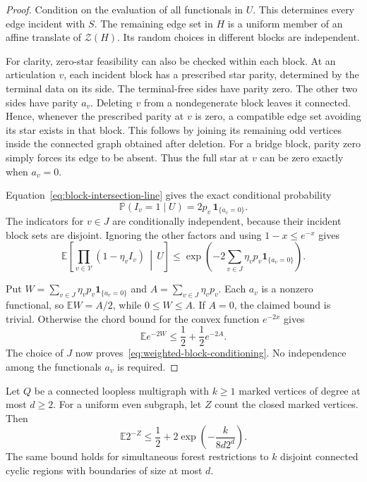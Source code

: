 \begin{proof}
Condition on the evaluation of all functionals in $U$.
This determines every edge incident with $S$.
The remaining edge set in $H$ is a uniform member of an affine translate of $\mathcal Z(H)$.
Its random choices in different blocks are independent.

For clarity, zero-star feasibility can also be checked within each block.
At an articulation $v$, each incident block has a prescribed star parity, determined by the terminal data on its side.
The terminal-free sides have parity zero.
The other two sides have parity $a_v$.
Deleting $v$ from a nondegenerate block leaves it connected.
Hence, whenever the prescribed parity at $v$ is zero, a compatible edge set avoiding its star exists in that block.
This follows by joining its remaining odd vertices inside the connected graph obtained after deletion.
For a bridge block, parity zero simply forces its edge to be absent.
Thus the full star at $v$ can be zero exactly when $a_v=0$.

Equation~\eqref{eq:block-intersection-line} gives the exact conditional probability
\[
 \mathbb P(I_v=1\mid U)=2p_v\,\mathbf1_{\{a_v=0\}}.
\]
The indicators for $v\in J$ are conditionally independent, because their incident block sets are disjoint.
Ignoring the other factors and using $1-x\le e^{-x}$ gives
\[
 \mathbb E\!\left[\prod_{v\in\mathcal V}(1-\eta_vI_v)\,\middle|\,U\right]
 \le\exp\!\left(-2\sum_{v\in J}\eta_vp_v\mathbf1_{\{a_v=0\}}\right).
\]

Put $W=\sum_{v\in J}\eta_vp_v\mathbf1_{\{a_v=0\}}$ and $A=\sum_{v\in J}\eta_vp_v$.
Each $a_v$ is a nonzero functional, so $\mathbb EW=A/2$, while $0\le W\le A$.
If $A=0$, the claimed bound is trivial.
Otherwise the chord bound for the convex function $e^{-2x}$ gives
\[
 \mathbb E e^{-2W}\le\frac12+\frac12e^{-2A}.
\]
The choice of $J$ now proves~\eqref{eq:weighted-block-conditioning}.
No independence among the functionals $a_v$ is required.
\end{proof}

\begin{theorem}\label{thm:sharper-exponential-cuts}
Let $Q$ be a connected loopless multigraph with $k\ge1$ marked vertices of degree at most $d\ge2$.
For a uniform even subgraph, let $Z$ count the closed marked vertices.
Then
\begin{equation}\label{eq:sharper-exponential-cuts}
 \mathbb E2^{-Z}\le\frac12+2\exp\!\left(-\frac{k}{8d2^d}\right).
\end{equation}
The same bound holds for simultaneous forest restrictions to $k$ disjoint connected cyclic regions with boundaries of size at most $d$.
\end{theorem}

